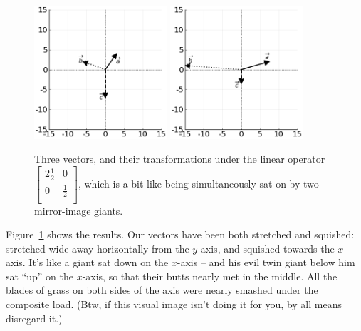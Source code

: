 \begin{figure}[hb]
\centering
\includegraphics[width=0.44\textwidth]{preoperators.png}
\includegraphics[width=0.44\textwidth]{stretchSquishOp.png}
\caption[.]{Three vectors, and their transformations under the linear operator 
{\scriptsize $\begin{bmatrix} 2\frac{1}{2} & 0 \\ 0 & \frac{1}{2} \\
\end{bmatrix}$,} which is a bit like being simultaneously sat on by two
mirror-image giants.}
\label{fig:stretchSquishOp}
\end{figure}

Figure~\ref{fig:stretchSquishOp} shows the results. Our vectors have been both
stretched and squished: stretched wide away horizontally from the $y$-axis, and
squished towards the $x$-axis. It's like a giant sat down on the $x$-axis --
and his evil twin giant below him sat ``up'' on the $x$-axis, so that their
butts nearly met in the middle. All the blades of grass on both sides of the
axis were nearly smashed under the composite load. (Btw, if this visual image
isn't doing it for you, by all means disregard it.)





%



